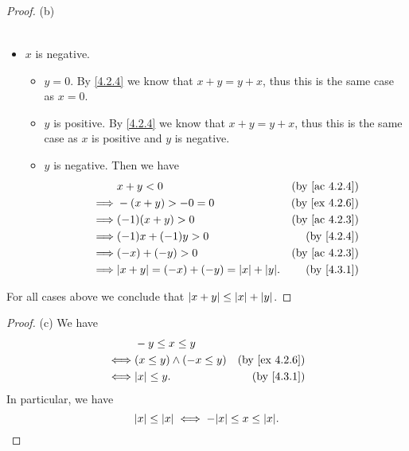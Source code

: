 \begin{proof}{(b)}
\begin{itemize}
\begin{itemize}
\begin{itemize}
\begin{align*}
                          \end{align*}
                  \end{itemize}
          \end{itemize}
    \item \(x\) is negative.
          \begin{itemize}
            \item \(y = 0\).
                  By \cref{4.2.4} we know that \(x + y = y + x\), thus this is the same case as \(x = 0\).
            \item \(y\) is positive.
                  By \cref{4.2.4} we know that \(x + y = y + x\), thus this is the same case as \(x\) is positive and \(y\) is negative.
            \item \(y\) is negative.
                  Then we have
                  \begin{align*}
                             & x + y < 0                                      & \text{(by \cref{ac 4.2.4})} \\
                    \implies & -(x + y) > -0 = 0                              & \text{(by \cref{ex 4.2.6})} \\
                    \implies & (-1)(x + y) > 0                                & \text{(by \cref{ac 4.2.3})} \\
                    \implies & (-1)x + (-1)y > 0                              & \text{(by \cref{4.2.4})}    \\
                    \implies & (-x) + (-y) > 0                                & \text{(by \cref{ac 4.2.3})} \\
                    \implies & \abs{x + y} = (-x) + (-y) = \abs{x} + \abs{y}. & \text{(by \cref{4.3.1})}
                  \end{align*}
          \end{itemize}
  \end{itemize}
  For all cases above we conclude that \(\left\lvert x + y\right\rvert \leq \left\lvert x\right\rvert + \left\lvert y\right\rvert\).
\end{proof}

\begin{proof}{(c)}
  We have
  \begin{align*}
         & -y \leq x \leq y                                           \\
    \iff & (x \leq y) \land (-x \leq y) & \text{(by \cref{ex 4.2.6})} \\
    \iff & \abs{x} \leq y.              & \text{(by \cref{4.3.1})}
  \end{align*}
  In particular, we have
  \[
    \abs{x} \leq \abs{x} \iff -\abs{x} \leq x \leq \abs{x}.
  \]
\end{proof}

